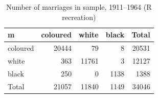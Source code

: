 \begin{table}

\caption{Number of marriages in sample, 1911--1964 (R recreation)}
\centering
\begin{tabular}[t]{lrrrr}
\toprule
m & coloured & white & black & Total\\
\midrule
coloured & 20444 & 79 & 8 & 20531\\
white & 363 & 11761 & 3 & 12127\\
black & 250 & 0 & 1138 & 1388\\
Total & 21057 & 11840 & 1149 & 34046\\
\bottomrule
\end{tabular}
\end{table}
